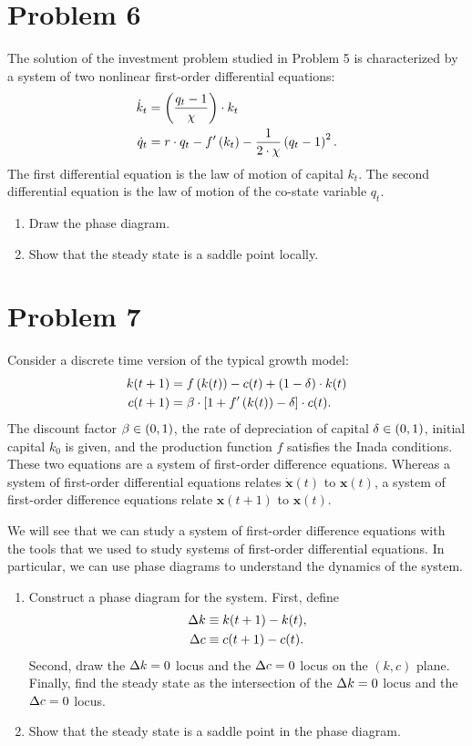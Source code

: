 \documentclass[letterpaper,12pt,leqno]{article}
\begin{document}
\section*{Problem 6}

The solution of the investment problem studied in Problem 5 is characterized by a system of two nonlinear first-order differential equations:
\begin{align*}
\dot{k}_{t} &=\left( \frac{q_{t}-1}{\chi} \right)\cdot  k_{t} \\
\dot{q}_{t} &=r\cdot q_{t}-f'\left( k_{t} \right) -\frac{1}{2\cdot \chi}\left( q_{t}-1 \right)^{2}.
\end{align*}
The first differential equation is the law of motion of capital $k_{t}$. The second differential equation is the law of motion of the co-state variable $q_{t}$.

\begin{enumerate}
\item Draw the phase diagram.
\item Show that the steady state is a saddle point locally.
\end{enumerate}

\section*{Problem 7}

Consider a discrete time version of the typical growth model:
\begin{align*}
k(t+1) &=f\left( k(t) \right) -c(t) +\left( 1-\delta \right)\cdot  k(t) \\
c(t+1) &=\beta\cdot  \left[  1+f'\left( k(t) \right) -\delta  \right]\cdot  c(t) .
\end{align*} 
The discount factor $\beta \in \left( 0,1 \right)$, the rate of depreciation of capital $\delta \in \left( 0,1 \right)$, initial capital $k_{0}$ is given, and the production function $f$ satisfies the Inada conditions. These two equations are a system of first-order difference equations. Whereas a system of first-order differential equations relates $\bm{\dot{x}}(t) $ to $\bm{x}(t)$, a system of first-order difference equations relate $\bm{x}(t+1) $ to $\bm{x}(t)$.

We will see that we can study a system of first-order difference equations with the tools that we used to study systems of first-order differential equations. In particular, we can use phase diagrams to understand the dynamics of the system.

\begin{enumerate}
\item Construct a phase diagram for the system. First, define 
\begin{align*}
\Delta k & \equiv k(t+1) -k(t) , \\
\Delta c & \equiv c(t+1) -c(t) .
\end{align*}
Second, draw the $\Delta k=0$ locus and the $\Delta c=0$ locus on the $(k,c)$ plane. Finally, find the steady state as the intersection of the $\Delta k=0$ locus and the $ \Delta c=0$ locus.
\item Show that the steady state is a saddle point in the phase diagram.
\end{enumerate}
\end{document}
